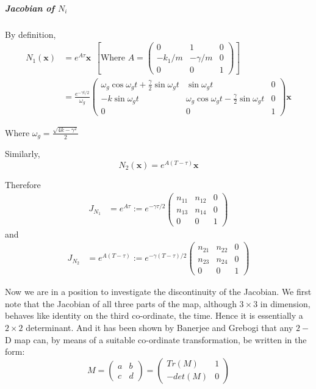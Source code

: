 \documentclass[oneside]{book}
\renewcommand{\(}{\begin{columns}}
\renewcommand{\)}{\end{columns}}
\newcommand{\<}[1]{\begin{column}{#1}}
\renewcommand{\>}{\end{column}}
\newcommand{\bb}[1]{\textbf{#1}}
\newcommand{\mb}[1]{\mathbf{#1}}
\newcommand{\subpara}{\subparagraph}
\begin{document}
\subpara{Jacobian of  $N_i$\\}

By definition,
\begin{align}
\label{eq-Nmatrix}
N_1(\bb{x})&=e^{A\tau}\bb{x}~~\left[\text{Where }A=
\begin{pmatrix}
0 & 1 & 0\\
-k_1/m & -\gamma/m & 0\\
0 & 0 & 1
\end{pmatrix}\right]
\\
&=\frac{e^{-\gamma t/2}}{\omega_g}
\begin{pmatrix}
\omega_g\cos{\omega_g t}+\frac{\gamma}{2}\sin{\omega_g t} & \sin{\omega_g t} & 0\\
-k\sin{\omega_g t} & \omega_g\cos{\omega_g t}-\frac{\gamma}{2}\sin{\omega_g t} 
& 0\\
0 & 0 & 1
\end{pmatrix}\bb{x}
\end{align}

Where $\omega_g=\frac{\sqrt{4k-\gamma^2}}{2}$



Similarly,
\[
N_2(\mb{x})=e^{A(T-\tau)}\mb{x}
\]

Therefore 
\begin{align}
\label{eq-n1-jacob}
J_{N_1}&=e^{A\tau}
:=e^{-\gamma\tau/2}
\begin{pmatrix}
n_{11} & n_{12} & 0\\
n_{13} & n_{14} & 0\\
0 & 0 & 1
\end{pmatrix}
\end{align}
and
\begin{align}
\label{eq-n2-jacob}
J_{N_2}&=e^{A(T-\tau)}
:=e^{-\gamma(T-\tau)/2}
\begin{pmatrix}
n_{21} & n_{22} & 0\\
n_{23} & n_{24} & 0\\
0 & 0 & 1
\end{pmatrix}
\end{align}


Now we are in a position to investigate the discontinuity of the Jacobian.  We 
first note that the Jacobian of all three parts of the map, although 
$3\times 3$ in dimension, behaves like identity on the third co-ordinate, the 
time.  Hence it is essentially a $2\times 2$ determinant.  And it has been 
shown by Banerjee and Grebogi that any $2-$D map can, by means of a suitable 
co-ordinate transformation, be written in the form:
\[
M=
\begin{pmatrix}
a & b\\
c & d
\end{pmatrix}
=
\begin{pmatrix}
Tr(M) & 1\\
-det(M) & 0
\end{pmatrix}
\]
\end{document}

